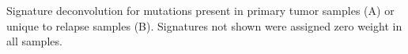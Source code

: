 Signature deconvolution for mutations present in primary tumor samples (A) or unique to relapse samples (B). Signatures not shown were assigned zero weight in all samples.
